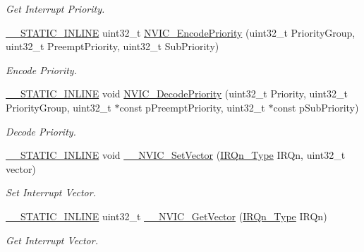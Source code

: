 \begin{DoxyCompactItemize}
\begin{DoxyCompactList}\small\item\em Get Interrupt Priority. \end{DoxyCompactList}\item 
\hyperlink{cmsis__iccarm_8h_aba87361bfad2ae52cfe2f40c1a1dbf9c}{\+\_\+\+\_\+\+S\+T\+A\+T\+I\+C\+\_\+\+I\+N\+L\+I\+NE} uint32\+\_\+t \hyperlink{group___c_m_s_i_s___core___n_v_i_c_functions_gadb94ac5d892b376e4f3555ae0418ebac}{N\+V\+I\+C\+\_\+\+Encode\+Priority} (uint32\+\_\+t Priority\+Group, uint32\+\_\+t Preempt\+Priority, uint32\+\_\+t Sub\+Priority)
\begin{DoxyCompactList}\small\item\em Encode Priority. \end{DoxyCompactList}\item 
\hyperlink{cmsis__iccarm_8h_aba87361bfad2ae52cfe2f40c1a1dbf9c}{\+\_\+\+\_\+\+S\+T\+A\+T\+I\+C\+\_\+\+I\+N\+L\+I\+NE} void \hyperlink{group___c_m_s_i_s___core___n_v_i_c_functions_ga3387607fd8a1a32cccd77d2ac672dd96}{N\+V\+I\+C\+\_\+\+Decode\+Priority} (uint32\+\_\+t Priority, uint32\+\_\+t Priority\+Group, uint32\+\_\+t $\ast$const p\+Preempt\+Priority, uint32\+\_\+t $\ast$const p\+Sub\+Priority)
\begin{DoxyCompactList}\small\item\em Decode Priority. \end{DoxyCompactList}\item 
\hyperlink{cmsis__iccarm_8h_aba87361bfad2ae52cfe2f40c1a1dbf9c}{\+\_\+\+\_\+\+S\+T\+A\+T\+I\+C\+\_\+\+I\+N\+L\+I\+NE} void \hyperlink{group___c_m_s_i_s___core___n_v_i_c_functions_ga0df355460bc1783d58f9d72ee4884208}{\+\_\+\+\_\+\+N\+V\+I\+C\+\_\+\+Set\+Vector} (\hyperlink{group___c_m_s_i_s__18_x_x___i_r_q_gaa44deabd252bda567898bae35a086adc}{I\+R\+Qn\+\_\+\+Type} I\+R\+Qn, uint32\+\_\+t vector)
\begin{DoxyCompactList}\small\item\em Set Interrupt Vector. \end{DoxyCompactList}\item 
\hyperlink{cmsis__iccarm_8h_aba87361bfad2ae52cfe2f40c1a1dbf9c}{\+\_\+\+\_\+\+S\+T\+A\+T\+I\+C\+\_\+\+I\+N\+L\+I\+NE} uint32\+\_\+t \hyperlink{group___c_m_s_i_s___core___n_v_i_c_functions_ga44b665d2afb708121d9b10c76ff00ee5}{\+\_\+\+\_\+\+N\+V\+I\+C\+\_\+\+Get\+Vector} (\hyperlink{group___c_m_s_i_s__18_x_x___i_r_q_gaa44deabd252bda567898bae35a086adc}{I\+R\+Qn\+\_\+\+Type} I\+R\+Qn)
\begin{DoxyCompactList}\small\item\em Get Interrupt Vector. \end{DoxyCompactList}\item 

\end{DoxyCompactItemize}
